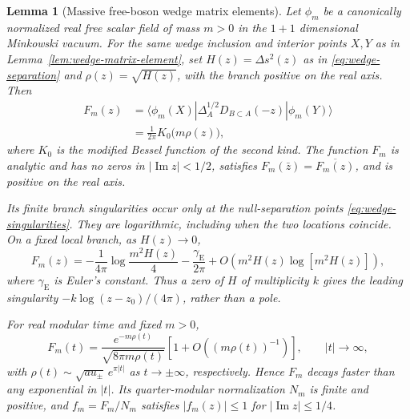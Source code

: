 \documentclass[a4paper,11pt]{article}
\newtheorem{lemma}[theorem]{Lemma}
\theoremstyle{definition}
\begin{document}
\begin{lemma}[Massive free-boson wedge matrix elements]
\label{lem:massive-free-wedge-matrix-element}
Let $\phi_m$ be a canonically normalized real free scalar field of mass $m>0$ in the $1+1$ dimensional Minkowski vacuum. For the same wedge inclusion and interior points $X,Y$ as in Lemma~\ref{lem:wedge-matrix-element}, set $H(z)=\Delta s^2(z)$ as in \eqref{eq:wedge-separation} and $\rho(z)=\sqrt{H(z)}$, with the branch positive on the real axis. Then
\begin{align}
 F_m(z)&=\langle\phi_m(X)|\Delta_A^{1/2}D_{B\subset A}(-z)|\phi_m(Y)\rangle
 \nonumber\\
 &=\frac{1}{2\pi}K_0\bigl(m\rho(z)\bigr),
 \label{eq:massive-free-wedge-matrix-element}
\end{align}
where $K_0$ is the modified Bessel function of the second kind. The function $F_m$ is analytic and has no zeros in $|\operatorname{Im}z|<1/2$, satisfies $F_m(\bar z)=\overline{F_m(z)}$, and is positive on the real axis.

Its finite branch singularities occur only at the null-separation points \eqref{eq:wedge-singularities}. They are logarithmic, including when the two locations coincide. On a fixed local branch, as $H(z)\to0$,
\begin{equation}
 F_m(z)=-\frac{1}{4\pi}\log\frac{m^2H(z)}{4}
          -\frac{\gamma_{\mathrm E}}{2\pi}
          +O\!\left(m^2H(z)\log[m^2H(z)]\right),
 \label{eq:massive-free-wedge-null-singularity}
\end{equation}
where $\gamma_{\mathrm E}$ is Euler's constant. Thus a zero of $H$ of multiplicity $k$ gives the leading singularity $-k\log(z-z_0)/(4\pi)$, rather than a pole.

For real modular time and fixed $m>0$,
\begin{equation}
 F_m(t)=\frac{e^{-m\rho(t)}}{\sqrt{8\pi m\rho(t)}}
           \left[1+O\!\left((m\rho(t))^{-1}\right)\right],
 \qquad |t|\to\infty,
 \label{eq:massive-free-wedge-decay}
\end{equation}
with $\rho(t)\sim\sqrt{a u_\pm}\,e^{\pi|t|}$ as $t\to\pm\infty$, respectively. Hence $F_m$ decays faster than any exponential in $|t|$. Its quarter-modular normalization $N_m$ is finite and positive, and $f_m=F_m/N_m$ satisfies $|f_m(z)|\leq1$ for $|\operatorname{Im}z|\leq1/4$.
\end{lemma}
\end{document}
